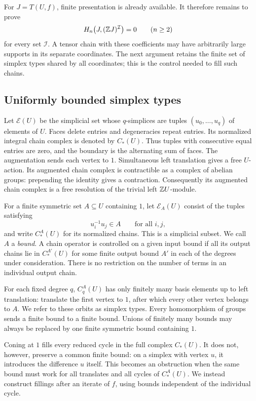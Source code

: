 For $J=T(U,f)$, finite presentation is already available.  It therefore
remains to prove
\[
 H_n\bigl(J,(\mathbb Z J)^{\mathcal I}\bigr)=0
 \qquad(n\ge2)
\]
for every set $\mathcal I$.  A tensor chain with these coefficients
may have arbitrarily large supports in its separate coordinates.
The next argument retains the finite set of simplex types shared by
all coordinates; this is the control needed to fill such chains.

\subsection{Uniformly bounded simplex types}

Let $\mathcal E(U)$ be the simplicial set whose $q$-simplices are
tuples $(u_0,\ldots,u_q)$ of elements of $U$.  Faces delete entries
and degeneracies repeat entries.  Its normalized integral chain
complex is denoted by $C_*(U)$.  Thus tuples with consecutive equal
entries are zero, and the boundary is the alternating sum of faces.
The augmentation sends each vertex to $1$.  Simultaneous left
translation gives a free $U$-action. Its augmented chain complex is
contractible as a complex of abelian groups: prepending the identity
gives a contraction.
Consequently its augmented chain complex is a free resolution of the
trivial left $\mathbb Z U$-module.

For a finite symmetric set $A\subseteq U$ containing $1$, let
$\mathcal E_A(U)$ consist of the tuples satisfying
\[
 u_i^{-1}u_j\in A\qquad\text{for all }i,j,
\]
and write $C_*^A(U)$ for its normalized chains.  This is a simplicial
subset.  We call $A$ a \emph{bound}.  A chain operator is controlled
on a given input bound if all its output chains lie in $C_*^{A'}(U)$
for some finite output bound $A'$ in each of the degrees under
consideration.  There is no restriction on the number of terms in an
individual output chain.

For each fixed degree $q$, $C_q^A(U)$ has only finitely many basis
elements up to left translation: translate the first vertex to $1$,
after which every other vertex belongs to $A$.  We refer to these
orbits as simplex types.  Every homomorphism of groups sends a finite
bound to a finite bound.  Unions of finitely many bounds may always
be replaced by one finite symmetric bound containing $1$.

Coning at $1$ fills every reduced cycle in the full complex $C_*(U)$.
It does not, however, preserve a common finite bound: on a simplex
with vertex $u$, it introduces the difference $u$ itself.  This becomes
an obstruction when the same bound must work for all translates and all cycles of
$C_*^A(U)$.  We instead construct fillings after an iterate of $f$,
using bounds independent of the individual cycle.

